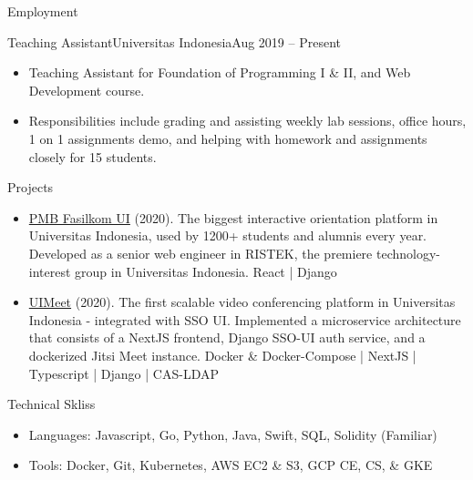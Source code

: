 \documentclass[]{mcdowellcv}
\begin{document}
\begin{cvsection}{Employment}
		\begin{cvsubsection}{Teaching Assistant}{Universitas Indonesia}{Aug 2019 -- Present}
			\begin{itemize}
				\item Teaching Assistant for Foundation of Programming I \& II, and Web Development course.
				\item Responsibilities include grading and assisting weekly lab sessions, office hours, 1 on 1 assignments demo, and helping with homework and assignments closely for 15 students.
			\end{itemize}
		\end{cvsubsection}
	
	\end{cvsection}
	
	\begin{cvsection}{Projects}
		\begin{cvsubsection}{}{}{}
			\begin{itemize}
				\item \href{http://pmb.cs.ui.ac.id/}{PMB Fasilkom UI} (2020). The biggest interactive orientation platform in Universitas Indonesia, used by 1200+ students and alumnis every year. Developed as a senior web engineer in RISTEK, the premiere technology-interest group in Universitas Indonesia. React | Django
				\item \href{http://jitsi-editreadmedapatbaju.cs.ui.ac.id/}{UIMeet} (2020). The first scalable video conferencing platform in Universitas Indonesia - integrated with SSO UI. Implemented a microservice architecture that consists of a NextJS frontend, Django SSO-UI auth service, and a dockerized Jitsi Meet instance. Docker \& Docker-Compose | NextJS | Typescript | Django | CAS-LDAP
			\end{itemize}
		\end{cvsubsection}
	\end{cvsection}
	
	\begin{cvsection}{Technical Skliss}
		\begin{cvsubsection}{}{}{}	
			\begin{itemize}
				\item Languages: Javascript, Go, Python, Java, Swift, SQL, Solidity (Familiar)
				\item Tools: Docker, Git, Kubernetes, AWS EC2 \& S3, GCP CE, CS, \& GKE
			\end{itemize}
		\end{cvsubsection}
	\end{cvsection}
	
\end{document}
